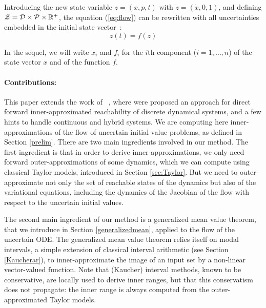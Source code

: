 \documentclass{sig-alternate-05-2015}
\newcommand\ForAuthors[1]%
 {\par\smallskip                     %
  \begin{center}%
   \fbox%
   {\parbox{0.9\linewidth}%
    {\raggedright\sc--- #1}%
   }%
  \end{center}%
  \par\smallskip                     %
 }
\def\R{{\mathbb R}}
\begin{document}
Introducing the new state variable $z=(x,p,t)$ with $\dot z = (\dot x,0,1)$, and defining ${\cal Z} = {\cal D} \times {\cal P} \times \R^+$,
the equation (\ref{eq:flow}) can be rewritten with all uncertainties embedded in the initial state vector~:
\begin{equation} \dot z(t) = f(z)
\label{eq:flowb}
\end{equation}

In the sequel, we will write $x_i$ and $f_i$ for the $i$th component ($i=1,\ldots,n$) of
the state vector $x$ and of the function $f$. 

\paragraph{Contributions:}

This paper extends the work of ~\cite{sas07,hscc14}, where were proposed an approach for direct forward inner-approximated reachability of 
discrete dynamical systems, and a few hints to handle continuous and hybrid systems. 
We are computing here inner-approximations of the flow of uncertain initial value problems, as defined in Section \ref{prelim}. 
There are two main ingredients involved in our method. The first ingredient is that in order to derive inner-approximations, we only need forward 
outer-approxima\-tions of some dynamics, which we can compute using classical
Taylor models, introduced in Section \ref{sec:Taylor}. But we need to outer-approximate not only 
the set of reachable states of the dynamics but also
of the variational equations, including the dynamics of the Jacobian of the flow with respect to the uncertain
initial values. 

The second main ingredient of our method is 
a generalized mean value theorem, that we introduce in Section \ref{generalizedmean}, applied to the flow of the uncertain ODE. 
The generalized mean value theorem relies itself on modal intervals, a simple 
extension of classical interval arithmetic (see Section \ref{Kaucherar}), to inner-approximate 
the image of an input set by a non-linear vector-valued function. Note that (Kaucher) interval methods, known to be conservative, 
are locally used to derive inner ranges, but that this conservatism does not propagate:
 the  inner range is always computed from the outer-approximated Taylor models. 
\end{document}
